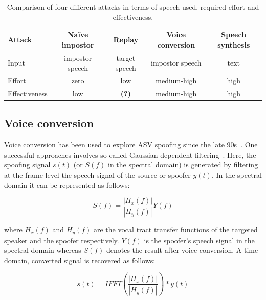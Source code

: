 \begin{table}
\renewcommand{\arraystretch}{1.3}
\begin{center}
    \begin{tabular}{ l | c c c c }
    \hline
     	 Attack & Na\"{i}ve impostor &  Replay & Voice conversion & Speech synthesis\\ 
    \hline
Input         & impostor speech  & target speech & impostor speech & text\\
Effort        & zero & low & medium-high & high\\
Effectiveness & low &  \textbf{(?)} & medium-high & high\\
 \hline
\hline
    \end{tabular}
    \caption{Comparison of four different attacks in terms of speech used,  required effort and effectiveness.}
		\label{tab::attacks}
   \end{center}
\end{table}



\subsection{Voice conversion}
\label{ssec:vconv}


Voice conversion has been used to explore ASV spoofing since the late 90s~\cite{Pellom1999}.  One successful approaches involves so-called Gaussian-dependent filtering~\cite{Matrouf2005}. Here, the spoofing signal $s(t)$ (or $S(f)$ in the spectral domain) is generated by filtering at the frame level the speech signal of the source or spoofer $y(t)$. In the spectral domain it can be represented as follows:

\begin{equation}
S(f) = \frac{\left|H_{x}(f)\right|}{\left|H_{y}(f)\right|}Y(f)
\label{eq:conversioneq}
\end{equation}

\noindent where $H_{x}(f)$ and $H_{y}(f)$ are the vocal tract transfer functions of the targeted speaker and the spoofer respectively.  $Y(f)$ is the spoofer's speech signal in the spectral domain whereas $S(f)$ denotes the result after voice conversion. A time-domain, converted  signal is recovered as follows:

\begin{equation}
s(t) = IFFT(\frac{\left|H_{x}(f)\right|}{\left|H_{y}(f)\right|})*y(t)
\label{eq:conversioneq_t}
\end{equation}

